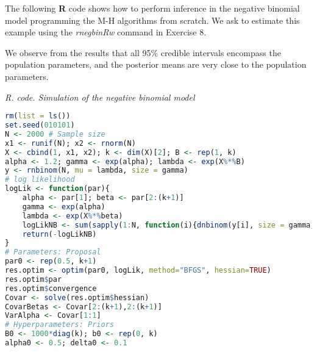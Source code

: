 The following \textbf{R} code shows how to perform inference in the negative binomial model programming the M-H algorithms from scratch. We ask to estimate this example using the \textit{rnegbinRw} command in Exercise 8.

We observe from the results that all 95\% credible intervals encompass the population parameters, and the posterior means are very close to the population parameters.

\begin{tcolorbox}[enhanced,width=4.67in,center upper,
	fontupper=\large\bfseries,drop shadow southwest,sharp corners]
	\textit{R. code. Simulation of the negative binomial model}
	\begin{VF}
		\begin{lstlisting}[language=R]
rm(list = ls())
set.seed(010101)
N <- 2000 # Sample size
x1 <- runif(N); x2 <- rnorm(N)
X <- cbind(1, x1, x2); k <- dim(X)[2]; B <- rep(1, k)
alpha <- 1.2; gamma <- exp(alpha); lambda <- exp(X%*%B)
y <- rnbinom(N, mu = lambda, size = gamma)
# log likelihood
logLik <- function(par){
	alpha <- par[1]; beta <- par[2:(k+1)]
	gamma <- exp(alpha)
	lambda <- exp(X%*%beta)
	logLikNB <- sum(sapply(1:N, function(i){dnbinom(y[i], size = gamma, mu = lambda[i], log = TRUE)}))
	return(-logLikNB)
}
# Parameters: Proposal
par0 <- rep(0.5, k+1)
res.optim <- optim(par0, logLik, method="BFGS", hessian=TRUE)
res.optim$par
res.optim$convergence
Covar <- solve(res.optim$hessian) 
CovarBetas <- Covar[2:(k+1),2:(k+1)]
VarAlpha <- Covar[1:1]
# Hyperparameters: Priors
B0 <- 1000*diag(k); b0 <- rep(0, k)
alpha0 <- 0.5; delta0 <- 0.1
\end{lstlisting}
	\end{VF}
\end{tcolorbox} 

